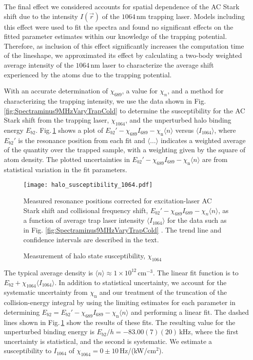 The final effect we considered accounts for spatial dependence of the AC Stark shift due to the intensity $I(\vec{r})$ of the $1064$\,nm trapping laser.
Models including this effect were used to fit the spectra and found no significant effects on the fitted parameter estimates within our knowledge of the trapping potential.
Therefore, as inclusion of this effect significantly increases the computation time of the lineshape, we approximated its effect by calculating a two-body weighted average intensity of the $1064$\,nm laser to characterize the average shift experienced by the atoms due to the trapping potential.

With an accurate determination of $\chi_{689}$, a value for $\chi_n$, and a method for characterizing the trapping intensity, we use the data shown in Fig.\,\ref{fig:Spectraminus9MHzVaryTrapCold} to determine the susceptibility for the AC Stark shift from the trapping laser, $\chi_{1064}$, and the unperturbed halo binding energy $E_{b2}$.
Fig.\,\ref{fig:ShiftWithTrapIntensity} shows a plot of $E_{b2}'-\chi_{689}I_{689} - \chi_{\text{n}}\langle n\rangle$ versus $\langle I_{1064} \rangle $, where $E_{b2}'$ is the resonance position from each fit and $\langle ... \rangle $ indicates a weighted average of the quantity over the trapped sample, with a weighting given by the square of atom density.
The plotted uncertainties in $E_{b2}'-\chi_{689}I_{689} - \chi_{\text{n}}\langle n\rangle$ are from statistical variation in the fit parameters.
	\begin{figure} 
	\centerline{
	  \texttt{[image: halo\_susceptibility\_1064.pdf]}}
	  \caption{Measurement of halo state susceptibility, $\chi_{1064}$}{Measured resonance positions corrected for excitation-laser AC Stark shift and collisional frequency shift, $E_{b2}'-\chi_{689} I_{689} - \chi_{n}\langle n\rangle$, as a function of average trap laser intensity $\langle I_{1064} \rangle$ for the data such as in Fig. \ref{fig:Spectraminus9MHzVaryTrapCold} . The trend line and confidence intervals are described in the text.}
	  \label{fig:ShiftWithTrapIntensity}
	\end{figure}

The typical average density is $\langle n\rangle\approx 1\times 10^{12}$\,cm$^{-3}$. 
The linear fit function is to $E_{b2}+\chi_{1064}\langle I_{1064} \rangle $.
In addition to statistical uncertainty, we account for the systematic uncertainty from $\chi_{\text{n}}$ and our treatment of the truncation of the collision-energy integral by using the limiting estimates for each parameter in determining $E_{b2} = E_{b2}'-\chi_{689}I_{689} - \chi_{\text{n}}\langle n\rangle$ and performing a linear fit.
The dashed lines shown in Fig.\,\ref{fig:ShiftWithTrapIntensity} show the results of these fits.
The resulting value for the unperturbed binding energy is $E_{b2}/h=-83.00(7)(20)$\,kHz, where the first uncertainty is statistical, and the second is systematic.
We estimate a susceptibility to $I_{1064}$ of $\chi_{1064}=0\pm 10$\,Hz/(kW/cm$^2$).

